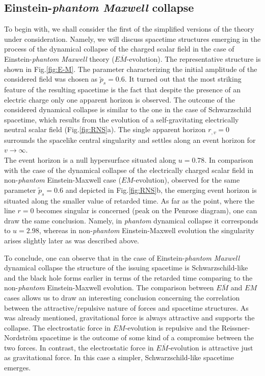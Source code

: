 \documentclass[aps,showpacs,nofootinbib,floatfix]{revtex4}
\newcommand{\tpe}{{\tilde p}}
\begin{document}
\subsection{Einstein-{\it phantom Maxwell} collapse}
\label{sec:E-M}
To begin with, we shall consider the first of the simplified versions of the theory under consideration. 
Namely, we will discuss spacetime structures emerging in the process of the dynamical collapse of the charged scalar field 
in the case of Einstein-{\it phantom Maxwell} theory ($E\overline{M}$-evolution). The representative structure 
is shown in Fig.\ref{fig:E-M}. 
The parameter characterizing the initial amplitude of the considered field was chosen as $\tpe_s=0.6$. 
It turned out that the most striking feature of the resulting
spacetime is the fact that despite the presence of an electric charge only one apparent horizon is observed.
The outcome of the considered dynamical collapse is similar to the one in the case of Schwarzschild spacetime, 
which results from the evolution of a self-gravitating electrically neutral scalar field (Fig.\ref{fig:RNS}a).
The single apparent horizon  $r_{,v}=0$ surrounds the spacelike central singularity and
settles along an event horizon for $v\rightarrow\infty$.\\
The event horizon is a null hypersurface situated along $u=0.78$. 
In comparison with the case of the dynamical collapse of the electrically charged scalar field in non-{\it phantom}
Einstein-Maxwell case ($EM$-evolution), observed for the same parameter $\tpe_s=0.6$ and depicted in Fig.\ref{fig:RNS}b,
the emerging event horizon is situated along the smaller value of retarded time. As far as the point, where the line $r=0$ becomes singular is concerned (peak on the Penrose diagram), one can
draw the same conclusion. Namely, in {\it phantom} dynamical collapse it corresponds to $u=2.98$, whereas 
in non-{\it phantom} Einstein-Maxwell evolution the singularity arises slightly later as was described above.
\par
To conclude, one can observe that in the case of Einstein-{\it phantom Maxwell} dynamical collapse the structure
of the issuing spacetime is Schwarzschild-like and the black hole forms earlier in terms of the retarded time
comparing to the non-{\it phantom} Einstein-Maxwell evolution. The comparison between $E\overline{M}$ and $EM$ cases 
allows us to draw an interesting conclusion concerning the correlation between the attractive/repulsive nature of forces 
and spacetime structures. As was already mentioned, gravitational force is always attractive and supports the collapse. 
The electrostatic force in $EM$-evolution is repulsive and the Reissner-Nordstr\"{o}m spacetime is the outcome 
of some kind of a compromise between the two forces. In contrast, the electrostatic force in $E\overline{M}$-evolution 
is attractive just as gravitational force. In this case a simpler, 
Schwarzschild-like spacetime emerges.
\end{document}
